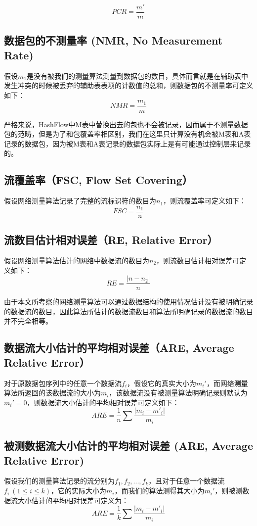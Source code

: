 \documentclass{article}
\begin{document}
$$
PCR = \frac{m'}{m}
$$

\subsection{数据包的不测量率  (NMR, No Measurement Rate)}
假设$m_1$是没有被我们的测量算法测量到数据包的数目，具体而言就是在辅助表中发生冲突的时候被丢弃的辅助表表项的计数值的总和，则数据包的不测量率可定义如下：
$$
NMR = \frac{m_1}{m}
$$

严格来说，HashFlow中M表中替换出去的包也不会被记录，因而属于不测量数据包的范畴，但是为了和包覆盖率相区别，我们在这里只计算没有机会被M表和A表记录的数据包，因为被M表和A表记录的数据包实际上是有可能通过控制层来记录的。

\subsection{ 流覆盖率（FSC, Flow Set Covering）}
假设网络测量算法记录了完整的流标识符的数目为$n_1$，则流覆盖率可定义如下：
$$
FSC = \frac{n_1}{n}
$$

\subsection{ 流数目估计相对误差（RE, Relative Error）}
假设网络测量算法估计的网络中数据流的数目为$n_2$，则流数目估计相对误差可定义如下：
$$
RE = \frac{|n - n_2|}{n}
$$

由于本文所考察的网络测量算法可以通过数据结构的使用情况估计没有被明确记录的数据流的数目，因此算法所估计的数据流数目和算法所明确记录的数据流的数目并不完全相等。

\subsection{ 数据流大小估计的平均相对误差（ARE, Average Relative Error）}
对于原数据包序列中的任意一个数据流$f_i$，假设它的真实大小为$m_i'$，而网络测量算法所返回的该数据流的大小为$m_i$，该数据流没有被测量算法明确记录则默认为$m_i'=0$，则数据流大小估计的平均相对误差可定义如下：
$$
ARE=\frac{1}{n}\sum\frac{|m_i - m'_i|}{m_i}
$$

\subsection{被测数据流大小估计的平均相对误差 (ARE, Average Relative Error)}
假设我们的测量算法记录的流分别为$f_1, f_2, ..., f_k$，且对于任意一个数据流$f_i ~(1 \le i \le k)$，它的实际大小为$m_i$，而我们的算法测得其大小为$m_i'$，则被测数据流大小估计的平均相对误差可定义为：
$$
ARE = \frac{1}{k}\sum\frac{|m_i - m'_i|}{m_i}
$$
\end{document}
